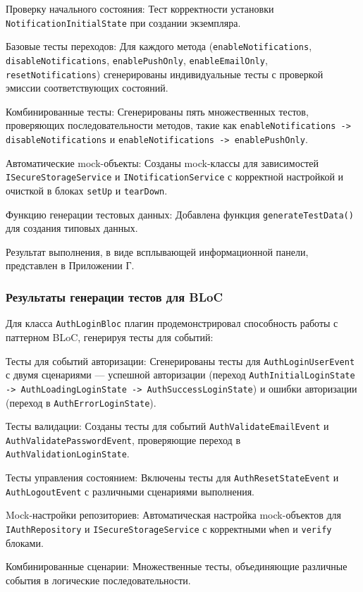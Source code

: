 \documentclass[14pt, russian]{scrartcl}
\begin{document}
\begin{itemize*}
    \item Проверку начального состояния: Тест корректности установки \texttt{NotificationInitialState} при создании экземпляра.
    \item Базовые тесты переходов: Для каждого метода (\texttt{enableNotifications}, \texttt{disableNotifications}, \texttt{enablePushOnly}, \texttt{enableEmailOnly}, \texttt{resetNotifications}) сгенерированы индивидуальные тесты с проверкой эмиссии соответствующих состояний.
    \item Комбинированные тесты: Сгенерированы пять множественных тестов, проверяющих последовательности методов, такие как \texttt{enableNotifications -> disableNotifications} и \texttt{enableNotifications -> enablePushOnly}.
    \item Автоматические mock-объекты: Созданы mock-классы для зависимостей \texttt{ISecureStorageService} и \texttt{INotificationService} с корректной настройкой и очисткой в блоках \texttt{setUp} и \texttt{tearDown}.
    \item Функцию генерации тестовых данных: Добавлена функция \texttt{generateTestData()} для создания типовых данных.
\end{itemize*}

Результат выполнения, в виде всплывающей информационной панели, представлен в Приложении Г.

\subsubsection{Результаты генерации тестов для BLoC}

Для класса \texttt{AuthLoginBloc} плагин продемонстрировал способность работы с паттерном BLoC, генерируя тесты для событий:

\begin{itemize*}
    \item Тесты для событий авторизации: Сгенерированы тесты для \texttt{AuthLoginUserEvent} с двумя сценариями — успешной авторизации (переход \texttt{AuthInitialLoginState -> AuthLoadingLoginState -> AuthSuccessLoginState}) и ошибки авторизации (переход в \texttt{AuthErrorLoginState}).
    \item Тесты валидации: Созданы тесты для событий \texttt{AuthValidateEmailEvent} и \texttt{AuthValidatePasswordEvent}, проверяющие переход в \texttt{AuthValidationLoginState}.
    \item Тесты управления состоянием: Включены тесты для \texttt{AuthResetStateEvent} и \texttt{AuthLogoutEvent} с различными сценариями выполнения.
    \item Mock-настройки репозиториев: Автоматическая настройка mock-объектов для \texttt{IAuthRepository} и \texttt{ISecureStorageService} с корректными \texttt{when} и \texttt{verify} блоками.
    \item Комбинированные сценарии: Множественные тесты, объединяющие различные события в логические последовательности.
\end{itemize*}
\end{document}
